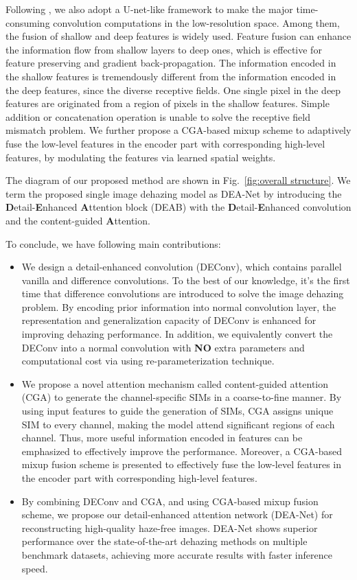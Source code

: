 \documentclass[lettersize,journal]{IEEEtran}
\begin{document}
Following \cite{dong2020CVPR,bai2022TIP,wu2021CVPR,hong2022AAAI}, we also adopt a U-net-like framework to make the major time-consuming convolution computations in the low-resolution space. Among them, the fusion of shallow and deep features is widely used.
Feature fusion can enhance the information flow from shallow layers to deep ones, which is effective for feature preserving and gradient back-propagation.
The information encoded in the shallow features is tremendously different from the information encoded in the deep features, since the diverse receptive fields. One single pixel in the deep features are originated from a region of pixels in the shallow features.
Simple addition or concatenation operation is unable to solve the receptive field mismatch problem.
We further propose a CGA-based mixup scheme to adaptively fuse the low-level features in the encoder part with corresponding high-level features, by modulating the features via learned spatial weights.

The diagram of our proposed method are shown in Fig.~\ref{fig:overall structure}. 
We term the proposed single image dehazing model as DEA-Net by introducing the \textbf{D}etail-\textbf{E}nhanced \textbf{A}ttention block (DEAB) with the \textbf{D}etail-\textbf{E}nhanced convolution and the content-guided \textbf{A}ttention.


To conclude, we have following main contributions:

\begin{itemize}
	\item We design a detail-enhanced convolution (DEConv), which contains parallel vanilla and difference convolutions. To the best of our knowledge, it's the first time that difference convolutions are introduced to solve the image dehazing problem. By encoding prior information into normal convolution layer, the representation and generalization capacity of DEConv is enhanced for improving dehazing performance. In addition, we equivalently convert the DEConv into a normal convolution with \textbf{NO} extra parameters and computational cost via using re-parameterization technique.
	\item We propose a novel attention mechanism called content-guided attention (CGA) to generate the channel-specific SIMs in a coarse-to-fine manner. By using input features to guide the generation of SIMs, CGA assigns unique SIM to every channel, making the model attend significant regions of each channel. Thus, more useful information encoded in features can be emphasized to effectively improve the performance. Moreover, a CGA-based mixup fusion scheme is presented to effectively fuse the low-level features in the encoder part with corresponding high-level features.
	\item By combining DEConv and CGA, and using CGA-based mixup fusion scheme, we propose our detail-enhanced attention network (DEA-Net) for reconstructing high-quality haze-free images. DEA-Net shows superior performance over the state-of-the-art dehazing methods on multiple benchmark datasets, achieving more accurate results with faster inference speed.
\end{itemize}
\end{document}
